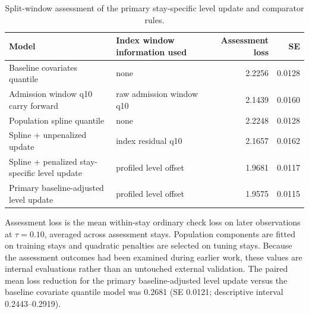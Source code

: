 \begin{table}[!htbp]
\caption{Split-window assessment of the primary stay-specific level update and comparator rules.}
\label{tab:model_comparison}
\centering
\begin{tabular}{llrr}
\hline
Model & Index window information used & Assessment loss & SE\\
\hline
Baseline covariates quantile & none & 2.2256 & 0.0128\\
Admission window q10 carry forward & raw admission window q10 & 2.1439 & 0.0160\\
Population spline quantile & none & 2.2248 & 0.0128\\
Spline + unpenalized update & index residual q10 & 2.1657 & 0.0162\\
Spline + penalized stay-specific level update & profiled level offset & 1.9681 & 0.0117\\
Primary baseline-adjusted level update & profiled level offset & 1.9575 & 0.0115\\
\hline
\end{tabular}
\par\smallskip
\footnotesize{Assessment loss is the mean within-stay ordinary check loss on later observations at $\tau=0.10$, averaged across assessment stays. Population components are fitted on training stays and quadratic penalties are selected on tuning stays. Because the assessment outcomes had been examined during earlier work, these values are internal evaluations rather than an untouched external validation. The paired mean loss reduction for the primary baseline-adjusted level update versus the baseline covariate quantile model was 0.2681 (SE 0.0121; descriptive interval 0.2443--0.2919).}
\end{table}
